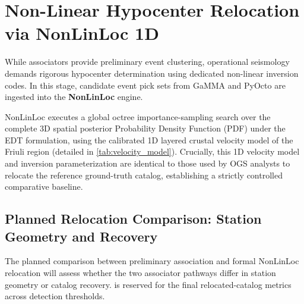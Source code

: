 \section{Non-Linear Hypocenter Relocation via \ac{NonLinLoc} 1D}
\label{sec:nonlinloc_relocation}

While associators provide preliminary event clustering, operational
seismology demands rigorous hypocenter determination using dedicated
non-linear inversion codes. In this stage, candidate event pick sets
from \ac{GaMMA} and \ac{PyOcto} are ingested into the \textbf{\ac{NonLinLoc}}
engine.

\ac{NonLinLoc} executes a global octree importance-sampling search over
the complete 3D spatial posterior Probability Density Function (PDF)
under the \ac{EDT} formulation, using the
calibrated 1D layered crustal velocity model of the Friuli region
(detailed in \cref{tab:velocity_model}). Crucially, this 1D
velocity model and inversion parameterization are identical to those
used by \ac{OGS} analysts to relocate the reference ground-truth catalog,
establishing a strictly controlled comparative baseline.

\subsection{Planned Relocation Comparison: Station Geometry and Recovery}
\label{subsec:relocation_divergence}

The planned comparison between preliminary association and formal
\ac{NonLinLoc} relocation will assess whether the two associator
pathways differ in station geometry or catalog recovery.
 is reserved for the final
relocated-catalog metrics across detection thresholds.

